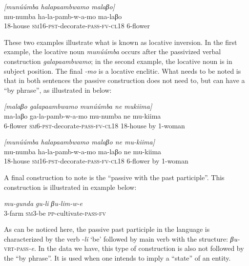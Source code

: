 \documentclass[output=paper		  ]{langscibook}
\begin{document}
    \ex\label{ex:kahigi:5b} \textit{[munúúmba halapaambwamo malaβo]}\\
\gll mu-numba   ha-la-pamb-w-a-mo               ma-laβo\\
18-house     \textsc{sm16-pst-}decorate-\textsc{pass-fv-cl18}   6-flower\\
    \z
\z

{These two examples illustrate what is known as locative inversion. In the first example, the locative noun} {\textit{munúúmba} }{occurs after the passivized verbal construction} {\textit{galapaambwamo}}{; in the second example, the locative noun is in subject position. The final} {\textit{{}-mo}} {is a locative enclitic. What needs to be noted is that in both sentences the passive construction does not need to, but can have a ``by phrase'', as illustrated in  below:}

\ea\label{ex:kahigi:6}
    \ea\label{ex:kahigi:6a} \textit{[malaβo galapaambwamo munúúmba ne mukiima]}\\
\gll ma-laβo   ga-la-pamb-w-a-mo              mu-numba   ne     mu-kiima\\
6-flower   \textsc{sm6-pst-}decorate-\textsc{pass-fv-cl18}   18-house   by   1-woman\\

 \ex\label{ex:kahigi:6b} \textit{[munúúmba halapaambwamo malaβo ne mu-kiima]}\\
\gll mu-numba   ha-la-pamb-w-a-mo               ma-laβo   ne   mu-kiima\\
18-house     \textsc{sm16-pst-}decorate-\textsc{pass-fv-cl18}    6-flower   by   1-woman\\
    \z
\z

{A final construction to note is the ``passive with the past participle''. This construction is illustrated in example  below:}

\ea\label{ex:kahigi:7} \gll \textit{mu-gunda}   \textit{gu-li}      \textit{βu-lim-w-e}\\
 3-farm    \textsc{sm3}-be     \textsc{pp}-cultivate-\textsc{pass-fv}\\
\z

{As can be noticed here, the passive past participle in the language is characterized by the verb -}{\textit{li} }{‘be’ followed by main verb with the structure:} {\textit{βu-}}\textsc{vrt-pass}{\textit{{}-e}}{. In the data we have, this type of construction is also not followed by the ``by phrase''. It is used when one intends to imply a ``state'' of an entity.}
\end{document}
